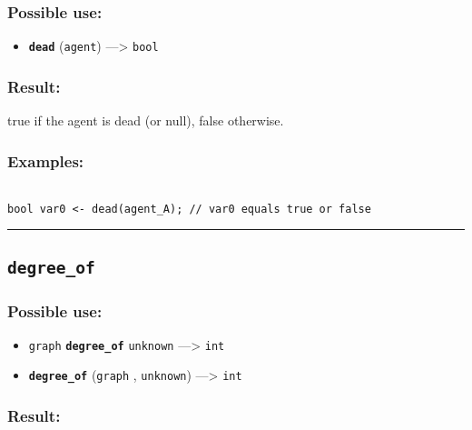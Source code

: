 \documentclass[]{book}
\providecommand{\tightlist}{%
  \setlength{\itemsep}{0pt}\setlength{\parskip}{0pt}}
\theoremstyle{definition}
\theoremstyle{definition}
\theoremstyle{definition}
\theoremstyle{remark}
\begin{document}
\subsubsection{Possible use:}\label{possible-use-126}

\begin{itemize}
\tightlist
\item
  \textbf{\texttt{dead}} (\texttt{agent}) ---\textgreater{}
  \texttt{bool}
\end{itemize}

\subsubsection{Result:}\label{result-122}

true if the agent is dead (or null), false otherwise.

\subsubsection{Examples:}\label{examples-96}

\begin{verbatim}
 
bool var0 <- dead(agent_A); // var0 equals true or false
\end{verbatim}

\begin{center}\rule{0.5\linewidth}{\linethickness}\end{center}

\subsection{\texorpdfstring{\texttt{degree\_of}}{degree\_of}}\label{degree_of}

\subsubsection{Possible use:}\label{possible-use-127}

\begin{itemize}
\tightlist
\item
  \texttt{graph} \textbf{\texttt{degree\_of}} \texttt{unknown}
  ---\textgreater{} \texttt{int}
\item
  \textbf{\texttt{degree\_of}} (\texttt{graph} , \texttt{unknown})
  ---\textgreater{} \texttt{int}
\end{itemize}

\subsubsection{Result:}\label{result-123}
\end{document}
